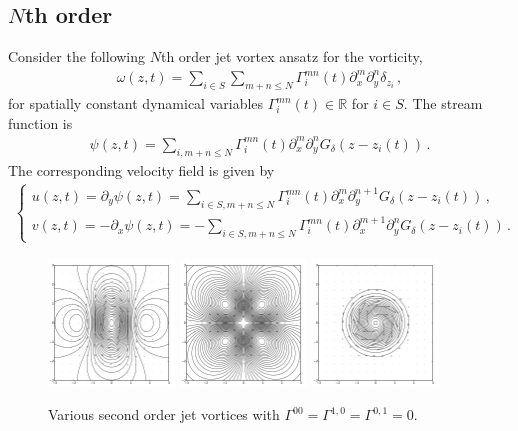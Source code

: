 \documentclass[12pt]{amsart}
\newcommand{\R}{\ensuremath{\mathbb{R}}}
\theoremstyle{remark}
\begin{document}
\subsection{$N$th order}
Consider the following $N$th order jet vortex ansatz for the vorticity,
\begin{align}
  \omega(z,t) = \sum_{i \in S} \sum_{m+n \leq N} \Gamma^{mn}_i(t) \partial_x^m \partial_y^n \delta_{z_i} \,,
  \label{eq:ansatz N}
\end{align}
for spatially constant dynamical variables $\Gamma^{mn}_i(t) \in \R$ for $i \in S$.
The stream function is 
\begin{align*}
  \psi(z,t) = \sum_{i, m+n \leq N} \Gamma^{mn}_i(t) \partial_x^m \partial_y^n G_\delta (z-z_i(t) )
\,.\end{align*}
The corresponding velocity field is given by
\begin{align}
\begin{cases}
  u(z,t) = \partial_y \psi(z,t) =  \sum_{i \in S,m+n \leq N} \Gamma^{mn}_i(t) \partial_x^m \partial_y^{n+1} G_\delta (z-z_i(t) )
  \,, \\
  v(z,t) = -\partial_x \psi(z,t) =  - \sum_{i \in S, m+n \leq N} \Gamma^{mn}_i(t) \partial_x^{m+1} \partial_y^n G_\delta (z-z_i(t) )\,.
\end{cases} \label{eq:u N}
\end{align}

\begin{figure}[h] %
   \centering
   \includegraphics[clip,trim =1in 1in 1in 1in,width=0.3\textwidth]{./images/two_xx.pdf} 
   \includegraphics[clip,trim =1in 1in 1in 1in,width=0.3\textwidth]{./images/two_xy.pdf} 
   \includegraphics[clip,trim =1in 1in 1in 1in,width=0.3\textwidth]{./images/two_xx_yy.pdf} 
   \caption{Various second order jet vortices with $\Gamma^{00} = \Gamma^{1,0} = \Gamma^{0,1} = 0$.}
   \label{fig:second}
\end{figure}
\end{document}
